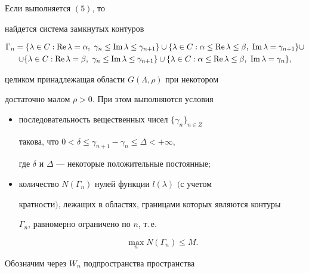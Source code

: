 \begin{lem}


Если выполняется $(5)$, то


найдется система замкнутых контуров


\begin{multline*}


\Gamma_n=


\{\lambda\in C:\re\lambda=\alpha,\ \gamma_n\le \im\lambda\le\gamma_{n+1}\}


\cup\{\lambda\in C:\alpha\le \re\lambda\le\beta,\ \im\lambda=\gamma_{n+1}\}\cup\\


%


\cup\{\lambda\in C:\re\lambda=\beta,\ \gamma_n\le \im\lambda\le\gamma_{n+1}\}


\cup\{\lambda\in C:\alpha\le \re\lambda\le\beta,\ \im\lambda=\gamma_n\},


\end{multline*}


целиком принадлежащая области $G(\Lambda,\rho)$ при некотором


достаточно малом $\rho>0$. При этом выполняются условия


\begin{itemize}


\item[(i)] последовательность вещественных чисел $\{\gamma_n\}_{n\in Z}$


такова, что $0<\delta\le\gamma_{n+1}-\gamma_n\le\Delta<+\infty$,


где $\delta$ и $\Delta$ --- некоторые положительные постоянные\/$;$


\item[(ii)] количество $N(\Gamma_n)$ нулей функции $l(\lambda)$ $($с учетом


кратности$)$, лежащих в областях, границами которых являются контуры


$\Gamma_n$, равномерно ограничено по $n$, т.\,е.


$$


\max\limits_nN(\Gamma_n)\le M.


$$


\end{itemize}


\end{lem}








Обозначим через $W_n$ подпространства пространства


